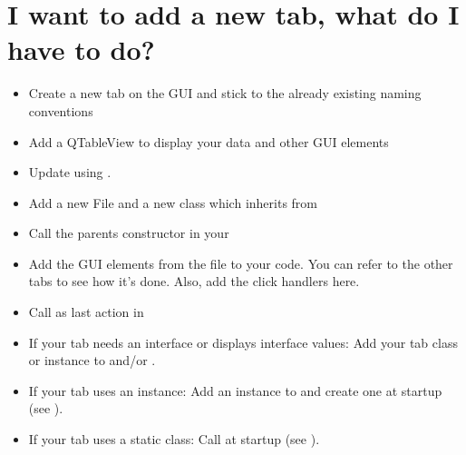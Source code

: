 \documentclass[letterpaper,10pt,english]{sphinxmanual}
\begin{document}
\section{I want to add a new tab, what do I have to do?}
\label{\detokenize{contributing:i-want-to-add-a-new-tab-what-do-i-have-to-do}}\begin{itemize}
\item {} 
Create a new tab on the GUI and stick to the already existing naming conventions

\item {} 
Add a QTableView to display your data and other GUI elements

\item {} 
Update  using .

\item {} 
Add a new File and a new class which inherits from {\hyperref[\detokenize{src:src.AbstractTab.AbstractTab}]{}}

\item {} 
Call the parents constructor in your 

\item {} 
Add the GUI elements from the  file to your code. You can refer to the other tabs
to see how it’s done. Also, add the click handlers here.

\item {} 
Call  as last action in 

\item {} 
If your tab needs an interface or displays interface values: Add your tab
class or instance to {\hyperref[\detokenize{src:src.Toolbox.Toolbox.updateInterfaceLabels}]{}} and/or {\hyperref[\detokenize{src:src.Toolbox.Toolbox.updateCANDataInstances}]{}}.

\item {} 
If your tab uses an instance: Add an instance to  and create one at startup (see ).

\item {} 
If your tab uses a static class: Call  at startup (see ).

\end{itemize}
\end{document}
